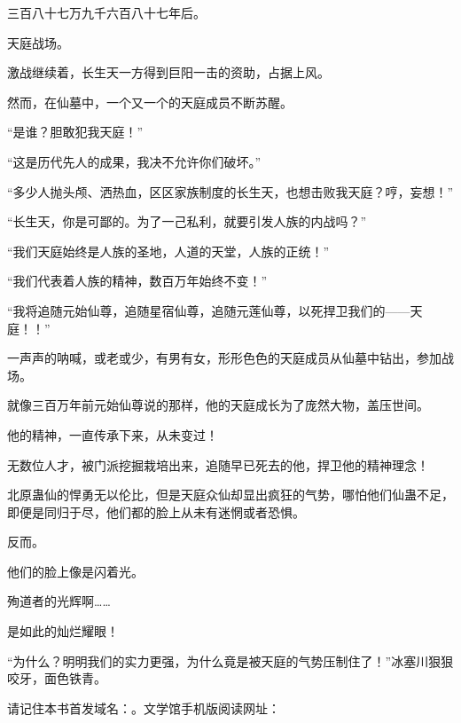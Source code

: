 \begin{this_body}
三百八十七万九千六百八十七年后。

天庭战场。

激战继续着，长生天一方得到巨阳一击的资助，占据上风。

然而，在仙墓中，一个又一个的天庭成员不断苏醒。

“是谁？胆敢犯我天庭！”

“这是历代先人的成果，我决不允许你们破坏。”

“多少人抛头颅、洒热血，区区家族制度的长生天，也想击败我天庭？哼，妄想！”

“长生天，你是可鄙的。为了一己私利，就要引发人族的内战吗？”

“我们天庭始终是人族的圣地，人道的天堂，人族的正统！”

“我们代表着人族的精神，数百万年始终不变！”

“我将追随元始仙尊，追随星宿仙尊，追随元莲仙尊，以死捍卫我们的——天庭！！”

一声声的呐喊，或老或少，有男有女，形形色色的天庭成员从仙墓中钻出，参加战场。

就像三百万年前元始仙尊说的那样，他的天庭成长为了庞然大物，盖压世间。

他的精神，一直传承下来，从未变过！

无数位人才，被门派挖掘栽培出来，追随早已死去的他，捍卫他的精神理念！

北原蛊仙的悍勇无以伦比，但是天庭众仙却显出疯狂的气势，哪怕他们仙蛊不足，即便是同归于尽，他们都的脸上从未有迷惘或者恐惧。

反而。

他们的脸上像是闪着光。

殉道者的光辉啊……

是如此的灿烂耀眼！

“为什么？明明我们的实力更强，为什么竟是被天庭的气势压制住了！”冰塞川狠狠咬牙，面色铁青。

请记住本书首发域名：。文学馆手机版阅读网址：

\end{this_body}

